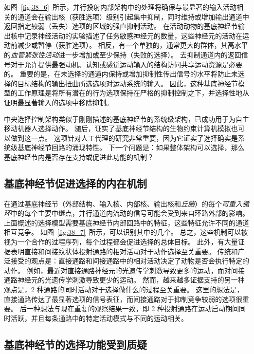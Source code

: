 如图~\ref{fig:38_6}~所示，并行投射内部架构中的处理将确保与最显著的输入活动相关的通道会在输出核（获胜选项）级别引起集中抑制，同时维持或增加输出通道中返回指定较弱（丢失）选项的区域的强直抑制活动。
在活动动物的基底神经节输出核中记录神经活动的实验描述了任务敏感神经元的数量，这些神经元的活动在运动前减少或暂停（获胜选项）。
相反，有一个单独的，通常更大的群体，其高水平的\textit{血管紧张性活动}进一步增加或至少保持（失败的选择）。
去抑制通道内的返回信号对于允许提供最强动机、认知或感觉运动输入的结构访问共享运动资源是必要的。
重要的是，在未选择的通道内保持或增加抑制性传出信号的水平将防止未选择的目标结构的输出扭曲所选选项对运动系统的输入。
因此，这种基底神经节模型的工作原理是将所有潜在的行为选项保持在严格的抑制控制之下，并选择性地从证明最显著输入的选项中移除抑制。


中央选择控制架构类似于刚刚描述的基底神经节的系统级架构，已成功用于为自主移动机器人选择动作。
随后，证实了基底神经节结构的生物约束计算机模拟也可以做到这一点。
这项针对人工代理的研究非常重要，因为它证实了选择确实是系统级基底神经节回路的涌现特性。
下一个问题是：如果整体架构可以选择，那么基底神经节内是否存在支持或促进此功能的机制？


\subsection{基底神经节促进选择的内在机制}

在通过基底神经节（外部结构、输入核、内部核、输出核和\textit{丘脑}）的每个\textit{可重入循环}中的每个主要中继点，并行通道内流动的信号可能会受到来自环路外部的影响。
上面概述的选择模型需要基底神经节内部回路中的特征，这些特征允许不同的通道相互竞争。
如图~\ref{fig:38_7}~所示，可以识别其中的几个。
总之，这些机制可以被视为一个合作的过程序列，每个过程都会促进选择的总体目标。
此外，有大量证据表明直接和间接纹状体投射通路的相对活动对于动作选择至关重要。
传统和广泛接受的观点是：直接通路和间接通路中的相对活动决定了动物是否会执行特定的动作。
例如，最近对直接通路神经元的光遗传学刺激导致更多的运动，而对间接通路神经元的光遗传学刺激导致更少的运动。
然而，越来越多证据支持的另一种观点是，2 种通路的同时活动对于选择做什么的过程至关重要。
这里的想法是，直接通路传达了最显著选项的信号表征，而间接通路对于抑制竞争较弱的选项很重要。
后一种想法与现在重复的观察结果一致，即 2 种投射通路在运动启动期间同时活跃，并且每条通路中的特定活动模式与不同的运动相关。



\subsection{基底神经节的选择功能受到质疑}

